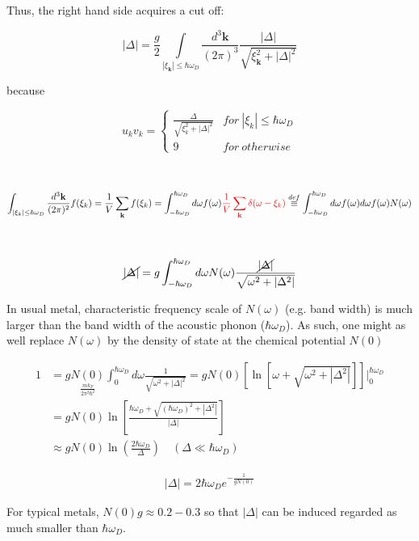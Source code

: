 Thus, the right hand side acquires a cut off:

\[|\Delta|=\frac{g}{2}\underset{|\xi_{\bm{k}}|\le\hbar\omega_D}{\int}\frac{d^3 \bm{k}}{(2\pi)^3}\frac{|\Delta|}{\sqrt{\xi_{\bm{k}}^2+|\Delta|^2}} \]

because

\[u_k v_k = \begin{cases}
\frac{\Delta}{\sqrt{\xi_k^2+|\Delta|^2}} & for\ |\xi_k|\le\hbar\omega_D\\
9 & for\ otherwise
\end{cases} \]

\dotfill

\ 

\[\int_{|\xi_k|\le\hbar\omega_D}\frac{d^3{\bf k}}{(2\pi)^2}f(\xi_k) = \frac{1}{V}\sum_{\bf k}f(\xi_k) = \int_{-\hbar\omega_D}^{\hbar\omega_D}d\omega f(\omega) {\color{red}{\frac{1}{V}\sum_{\bf k}\delta(\omega-\xi_k)}} \overset{def}{\equiv}\int_{-\hbar\omega_D}^{\hbar\omega_D}d\omega f(\omega) d\omega f(\omega)N(\omega) \]

\dotfill

\ 

\[\cancel{|\Delta|} = g\int_{-\hbar\omega_D}^{\hbar\omega_D}d\omega N(\omega)\frac{\cancel{|\Delta|}}{\sqrt{\omega^2+|\Delta^2|}} \]

In usual metal, characteristic frequency scale of $N(\omega)$ (e.g. band width) is much larger than the band width of the acoustic phonon ($\hbar\omega_D$). As such, one might as well replace $N(\omega)$ by the density of state at the chemical potential $N(0)$

\[\begin{split}
1 &= g\underset{\frac{mk_F}{2\pi^2\hbar^2}}{N(0)}\int_0^{\hbar\omega_D} d\omega\frac{1}{\sqrt{\omega^2+|\Delta|^2}} = gN(0)\left[\ln[\omega+\sqrt{\omega^2+|\Delta^2|}]\right]\Big|_0^{\hbar\omega_D}\\
&=gN(0)\ln\left[\frac{\hbar\omega_D+\sqrt{(\hbar\omega_D)^2+|\Delta^2|}}{|\Delta|}\right]\\
&\approx gN(0)\ln\left(\frac{2\hbar\omega_D}{\Delta}\right)\quad (\Delta\ll\hbar\omega_D)
\end{split} \]

\begin{align}\tag{B}
|\Delta| = 2\hbar\omega_De^{-\frac{1}{gN(0)}}
\end{align}

For typical metals, $N(0)g\approx0.2-0.3$ so that $|\Delta|$ can be induced regarded as much smaller than $\hbar\omega_D$. 

